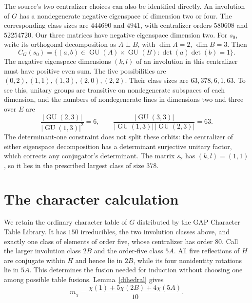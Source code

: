\documentclass[11pt,a4paper]{article}
\begin{document}
The source's two centralizer choices can also be identified directly.
An involution of $G$ has a nondegenerate negative eigenspace of
dimension two or four. The corresponding class sizes are $444690$
and $4941$, with centralizer orders $580608$ and $52254720$.
Our three matrices have negative eigenspace dimension two.
For $s_0$, write its orthogonal decomposition as $A\perp B$, with
$\dim A=2$, $\dim B=3$. Then
\[
 C_G(s_0)=\{(a,b)\in\operatorname{GU}(A)\times
 \operatorname{GU}(B):\det(a)\det(b)=1\}.
\]
The negative eigenspace dimensions $(k,l)$ of an involution in this
centralizer must have positive even sum. The five possibilities are
$(0,2),(1,1),(1,3),(2,0),(2,2)$. Their class sizes are
$63,378,6,1,63$. To see this, unitary groups are transitive on
nondegenerate subspaces of each dimension, and the numbers of
nondegenerate lines in dimensions two and three over $E$ are
\[
 \frac{|\operatorname{GU}(2,3)|}{|\operatorname{GU}(1,3)|^2}=6,
 \qquad
 \frac{|\operatorname{GU}(3,3)|}
 {|\operatorname{GU}(1,3)|\,|\operatorname{GU}(2,3)|}=63.
\]
The determinant-one constraint does not split these orbits: the
centralizer of either eigenspace decomposition has a determinant
surjective unitary factor, which corrects any conjugator's determinant.
The matrix $s_2$ has $(k,l)=(1,1)$, so it lies in the prescribed
largest class of size $378$.

\section{The character calculation}
We retain the ordinary character table of $G$ distributed by the
GAP Character Table Library. It has $150$ irreducibles, the two
involution classes above, and exactly one class of elements of order
five, whose centralizer has order $80$. Call the larger involution
class $2B$ and the order-five class $5A$. All five reflections of
$H$ are conjugate within $H$ and hence lie in $2B$, while its four
nonidentity rotations lie in $5A$. This determines the fusion needed
for induction without choosing one among possible table fusions.
Lemma~\ref{dihedral} gives
\begin{equation}\label{multiplicity}
 m_\chi=\frac{\chi(1)+5\chi(2B)+4\chi(5A)}{10}.
\end{equation}
\end{document}
